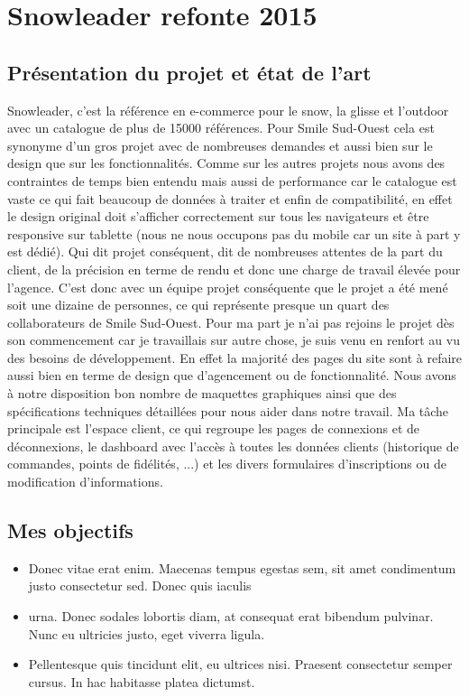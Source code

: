 \documentclass[a4paper,11pt,twoside]{report}
\begin{document}
        \newpage
    
  \section{Snowleader refonte 2015}
    \subsection*{Présentation du projet et état de l'art}
    Snowleader, c'est la référence en e-commerce pour le snow, la glisse et l'outdoor avec un catalogue de plus de 15000 références. Pour Smile Sud-Ouest cela est synonyme d'un gros projet avec de nombreuses demandes et aussi bien sur le design que sur les fonctionnalités. Comme sur les autres projets nous avons des contraintes de temps bien entendu mais aussi de performance car le catalogue est vaste ce qui fait beaucoup de données à traiter et enfin de compatibilité, en effet le design original doit s'afficher correctement sur tous les navigateurs et être responsive sur tablette (nous ne nous occupons pas du mobile car un site à part y est dédié). Qui dit projet conséquent, dit de nombreuses attentes de la part du client, de la précision en terme de rendu et donc une charge de travail élevée pour l'agence. C'est donc avec un équipe projet conséquente que le projet a été mené soit une dizaine de personnes, ce qui représente presque un quart des collaborateurs de Smile Sud-Ouest. Pour ma part je n'ai pas rejoins le projet dès son commencement car je travaillais sur autre chose, je suis venu en renfort au vu des besoins de développement. En effet la majorité des pages du site sont à refaire aussi bien en terme de design que d'agencement ou de fonctionnalité. Nous avons à notre disposition bon nombre de maquettes graphiques ainsi que des spécifications techniques détaillées pour nous aider dans notre travail. Ma tâche principale est l'espace client, ce qui regroupe les pages de connexions et de déconnexions, le dashboard avec l'accès à toutes les données clients (historique de commandes, points de fidélités, ...) et les divers formulaires d'inscriptions ou de modification d'informations. 
    \subsection*{Mes objectifs}
      \begin{itemize}

	\item Donec vitae erat enim. Maecenas tempus egestas sem, sit amet condimentum justo consectetur sed. Donec quis iaculis 
	\item urna. Donec sodales lobortis diam, at consequat erat bibendum pulvinar. Nunc eu ultricies justo, eget viverra ligula. 
	\item Pellentesque quis tincidunt elit, eu ultrices nisi. Praesent consectetur semper cursus. In hac habitasse platea dictumst. 

      \end{itemize}
\end{document}

